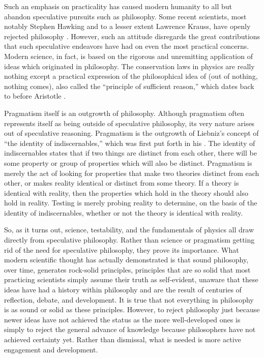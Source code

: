 Such an emphasis on practicality has caused modern humanity to all but abandon speculative pursuits such as philosophy.  
Some recent scientists, most notably Stephen Hawking and to a lesser extent Lawrence Krauss, have openly rejected philosophy \citep{warman2011, andersen2012}.
However, such an attitude disregards the great contributions that such speculative endeavors have had on even the most practical concerns.  Modern science, in fact, is based on the rigorous and unremitting application of ideas which originated in philosophy.  The conservation laws in physics are really nothing except a practical expression of the philosophical idea of  (out of nothing, nothing comes), also called the ``principle of sufficient reason,'' which dates back to before Aristotle \citep{psr2011}.

Pragmatism itself is an outgrowth of philosophy.  Although pragmatism often represents itself as being outside of speculative philosophy,  its very nature arises out of speculative reasoning.  Pragmatism is the outgrowth of Liebniz's concept of ``the identity of indiscernables,'' which was first put forth in his  \citep{ident2012}.  The identity of indiscernables states that if two things are distinct from each other, there will be some property or group of properties which will also be distinct.  Pragmatism is merely the act of looking for properties that make two theories distinct from each other, or makes reality identical or distinct from some theory.  If a theory is identical with reality, then the properties which hold in the theory should also hold in reality.  Testing is merely probing reality to determine, on the basis of the identity of indiscernables, whether or not the theory is identical with reality.

So, as it turns out, science, testability, and the fundamentals of physics all draw directly from speculative philosophy.  Rather than science or pragmatism getting rid of the need for speculative philosophy, they prove its importance.  What modern scientific thought has actually demonstrated is that sound philosophy, over time, generates rock-solid principles, principles that are so solid that most practicing scientists simply assume their truth as self-evident, unaware that these ideas have had a history within philosophy and are the result of centuries of reflection, debate, and development.  It is true that not everything in philosophy is as sound or solid as these principles.  However, to reject philosophy just because newer ideas have not achieved the status as the more well-developed ones is simply to reject the general advance of knowledge because philosophers have not achieved certainty yet.  Rather than dismissal, what is needed is more active engagement and development.

